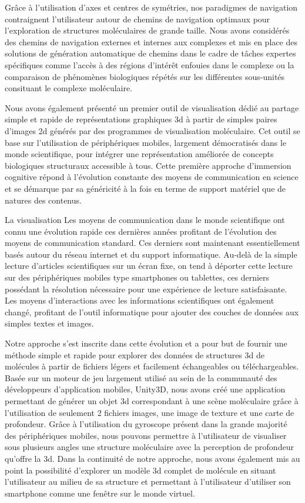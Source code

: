 Grâce à l'utilisation d'axes et centres de symétries, nos paradigmes de navigation contraignent l'utilisateur autour de chemins de navigation optimaux pour l'exploration de structures moléculaires de grande taille. Nous avons considérés des chemins de navigation externes et internes aux complexes et mis en place des solutions de génération automatique de chemins dans le cadre de tâches expertes spécifiques comme l'accès à des régions d'intérêt enfouies dans le complexe ou la comparaison de phénomènes biologiques répétés sur les différentes sous-unités consituant le complexe moléculaire.


Nous avons également présenté un premier outil de visualisation dédié au partage simple et rapide de représentations graphiques 3d à partir de simples paires d'images 2d générés par des programmes de visualisation moléculaire. Cet outil se base sur l'utilisation de périphériques mobiles, largement démocratisés dans le monde scientifique, pour intégrer une représentation améliorée de concepts biologiques structuraux accessible à tous. Cette première approche d'immersion cognitive répond à l'évolution constante des moyens de communication en science et se démarque par sa généricité à la fois en terme de support matériel que de natures des contenus.

La visualisation Les moyens de communication dans le monde scientifique ont connu une évolution rapide ces dernières années profitant de l'évolution des moyens de communication standard. Ces derniers sont maintenant essentiellement basés autour du réseau internet et du support informatique. Au-delà de la simple lecture d'articles scientifiques sur un écran fixe, on tend à déporter cette lecture sur des périphériques mobiles type smartphones ou tablettes, ces derniers possédant la résolution nécessaire pour une expérience de lecture satisfaisante. Les moyens d'interactions avec les informations scientifiques ont également changé, profitant de l'outil informatique pour ajouter des couches de données aux simples textes et images.

Notre approche s'est inscrite dans cette évolution et a pour but de fournir une méthode simple et rapide pour explorer des données de structures 3d de molécules à partir de fichiers légers et facilement échangeables ou téléchargeables. Basée sur un moteur de jeu largement utilisé au sein de la communauté des développeurs d'application mobiles, Unity3D, nous avons créé une application permettant de générer un objet 3d correspondant à une scène moléculaire grâce à l'utilisation de seulement 2 fichiers images, une image de texture et une carte de profondeur. Grâce à l'utilisation du gyroscope présent dans la grande majorité des périphériques mobiles, nous pouvons permettre à l'utilisateur de visualiser sous plusieurs angles une structure moléculaire avec la perception de profondeur qu'offre la 3d.
Dans la continuité de notre approche, nous avons également mis au point la possibilité d'explorer un modèle 3d complet de molécule en situant l'utilisateur au milieu de sa structure et permettant à l'utilisateur d'utiliser son smartphone comme une fenêtre sur le monde virtuel.

